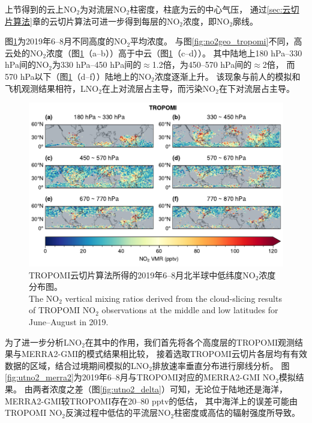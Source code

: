 上节得到的云上NO$_2$为对流层NO$_2$柱密度，柱底为云的中心气压，
通过\ref{sec:云切片算法}章的云切片算法可进一步得到每层的NO$_2$浓度，即NO$_2$廓线。

图\ref{fig:utno2_tropomi}为2019年6--8月不同高度的NO$_2$平均浓度。
与图\ref{fig:no2geo_tropomi}不同，高云处的NO$_2$浓度（图\ref{fig:utno2_tropomi}（a--b））高于中云（图\ref{fig:utno2_tropomi}（c--d））。
其中陆地上180 hPa--330 hPa间的NO$_2$为330 hPa--450 hPa间的$\approx$1.2倍，为450--570 hPa间的$\approx$2倍，
而570 hPa以下（图\ref{fig:utno2_tropomi}（d--f））陆地上的NO$_2$浓度逐渐上升。
该现象与前人的模拟和飞机观测结果相符，LNO$_2$在上对流层占主导，而污染NO$_2$在下对流层占主导\citep{Pickering.1996,Ott.2010,Laughner.2017}。


\begin{figure}[htbp]
    \centering
    \includegraphics[width=15cm]{./figures/utno2_tropomi.pdf}
    \caption{
    TROPOMI云切片算法所得的2019年6--8月北半球中低纬度NO$_2$浓度分布图。 \\
    The NO$_2$ vertical mixing ratios derived from the cloud-slicing results of TROPOMI NO$_2$ observations at the middle and low latitudes for June--August in 2019.
    }
    \label{fig:utno2_tropomi}
\end{figure}


为了进一步分析LNO$_2$在其中的作用，我们首先将各个高度层的TROPOMI观测结果与MERRA2-GMI的模式结果相比较，
接着选取TROPOMI云切片各层均有有效数据的区域，结合过境期间模拟的LNO$_2$排放速率垂直分布进行廓线分析。
图\ref{fig:utno2_merra2}为2019年6--8月与TROPOMI对应的MERRA2-GMI NO$_2$模拟结果。
由两者浓度之差（图\ref{fig:utno2_delta}）可知，无论位于陆地还是海洋，MERRA2-GMI较TROPOMI存在20--80 pptv的低估，
其中海洋上的误差可能由TROPOMI NO$_2$反演过程中低估的平流层NO$_2$柱密度或高估的辐射强度所导致\citep{VanGeffen.2020}。


